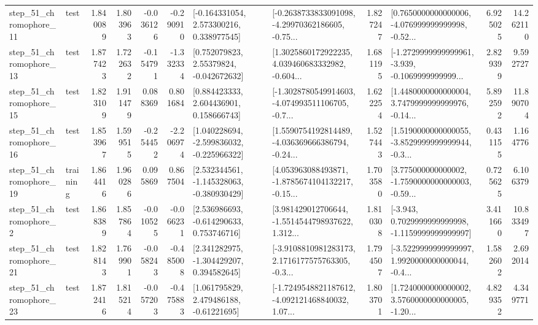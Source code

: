 \begin{tabular}{llrrrrllrlrr}
   step\_51\_chromophore\_11 &      test &      1.840089 &    1.803963 &     -0.036126 & -0.290910 &    [-0.164331054, 2.573300216, 0.338977545] &  [-0.2638733833091098, -4.29970362186605, -0.75... &       1.827247 &  [0.7650000000000006, -4.076999999999998, -0.52... &            6.925025 &         14.262110 \\
   step\_51\_chromophore\_13 &      test &      1.877423 &    1.722632 &     -0.154791 & -1.332334 &     [0.752079823, 2.55379824, -0.042672632] &  [1.3025860172922235, 4.039460683332982, -0.604... &       1.681195 &  [-1.2729999999999961, -3.939, -0.1069999999999... &            2.829399 &          9.592727 \\
   step\_51\_chromophore\_15 &      test &      1.823109 &    1.911479 &      0.088369 &  0.801684 &     [0.884423333, 2.604436901, 0.158666743] &  [-1.3028780549914603, -4.074993511106705, -0.7... &       1.622254 &  [1.4480000000000004, 3.7479999999999976, -0.14... &            5.892592 &         11.890704 \\
   step\_51\_chromophore\_16 &      test &      1.853967 &    1.599515 &     -0.254452 & -2.206974 &   [1.040228694, -2.599836032, -0.225966322] &  [1.5590754192814489, -4.036369666386794, -0.24... &       1.527443 &  [1.5190000000000055, -3.8529999999999944, -0.3... &            0.431155 &          1.164776 \\
   step\_51\_chromophore\_19 &  training &      1.864416 &    1.960286 &      0.095869 &  0.867504 &   [2.532344561, -1.145328063, -0.380930429] &  [4.053963088493871, -1.8785674104132217, -0.15... &       1.703580 &  [3.775000000000002, -1.7590000000000003, -0.59... &            0.725625 &          6.106379 \\
    step\_51\_chromophore\_2 &      test &      1.868389 &    1.857864 &     -0.010525 & -0.066231 &    [2.536986693, -0.614290633, 0.753746716] &  [3.981429012706644, -1.5514544798937622, 1.312... &       1.810308 &  [-3.943, 0.7029999999999998, -1.1159999999999997] &            3.411660 &         10.833497 \\
   step\_51\_chromophore\_21 &      test &      1.828143 &    1.769901 &     -0.058243 & -0.485008 &    [2.341282975, -1.304429207, 0.394582645] &  [-3.9108810981283173, 2.1716177575763305, -0.3... &       1.794507 &  [-3.5229999999999997, 1.9920000000000044, -0.4... &            1.582602 &          2.692014 \\
   step\_51\_chromophore\_23 &      test &      1.872416 &    1.815214 &     -0.057203 & -0.475883 &     [1.061795829, 2.479486188, -0.61221695] &  [-1.7249548821187612, -4.092121468840032, 1.07... &       1.803701 &  [1.7240000000000002, 3.5760000000000005, -1.20... &            4.829352 &          4.349771 \\

\end{tabular}
